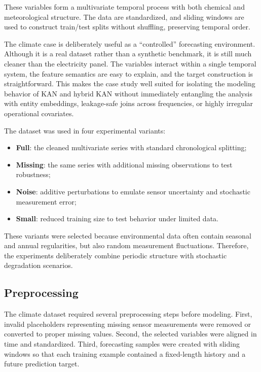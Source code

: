 \documentclass[10pt,conference,onecolumn]{IEEEtran}
\begin{document}
These variables form a multivariate temporal process with both chemical and meteorological structure. The data are standardized, and sliding windows are used to construct train/test splits without shuffling, preserving temporal order.

The climate case is deliberately useful as a ``controlled'' forecasting environment. Although it is a real dataset rather than a synthetic benchmark, it is still much cleaner than the electricity panel. The variables interact within a single temporal system, the feature semantics are easy to explain, and the target construction is straightforward. This makes the case study well suited for isolating the modeling behavior of KAN and hybrid KAN without immediately entangling the analysis with entity embeddings, leakage-safe joins across frequencies, or highly irregular operational covariates.

The dataset was used in four experimental variants:
\begin{itemize}
    \item \textbf{Full}: the cleaned multivariate series with standard chronological splitting;
    \item \textbf{Missing}: the same series with additional missing observations to test robustness;
    \item \textbf{Noise}: additive perturbations to emulate sensor uncertainty and stochastic measurement error;
    \item \textbf{Small}: reduced training size to test behavior under limited data.
\end{itemize}

These variants were selected because environmental data often contain seasonal and annual regularities, but also random measurement fluctuations. Therefore, the experiments deliberately combine periodic structure with stochastic degradation scenarios.

\subsection{Preprocessing}

The climate dataset required several preprocessing steps before modeling. First, invalid placeholders representing missing sensor measurements were removed or converted to proper missing values. Second, the selected variables were aligned in time and standardized. Third, forecasting samples were created with sliding windows so that each training example contained a fixed-length history and a future prediction target.
\end{document}
